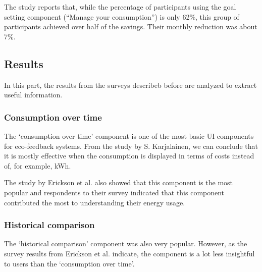 \documentclass[journal]{vgtc}                %
\begin{document}
The study reports that, while the percentage of participants using the goal setting component (``Manage your consumption'') is only 62\%, this group of participants achieved over half of the savings. Their monthly reduction was about 7\%.

\subsection{Results}
In this part, the results from the surveys describeb before are analyzed to extract useful information.

%

\subsubsection{Consumption over time}
The `consumption over time' component is one of the most basic UI components for eco-feedback systems. From the study by S. Karjalainen, we can conclude that it is mostly effective when the consumption is displayed in terms of costs instead of, for example, kWh.

The study by Erickson et al. also showed that this component is the most popular and respondents to their survey indicated that this component contributed the most to understanding their energy usage.
\subsubsection{Historical comparison}
The `historical comparison' component was also very popular. However, as the survey results from Erickson et al. indicate, the component is a lot less insightful to users than the `consumption over time'. 
\end{document}
